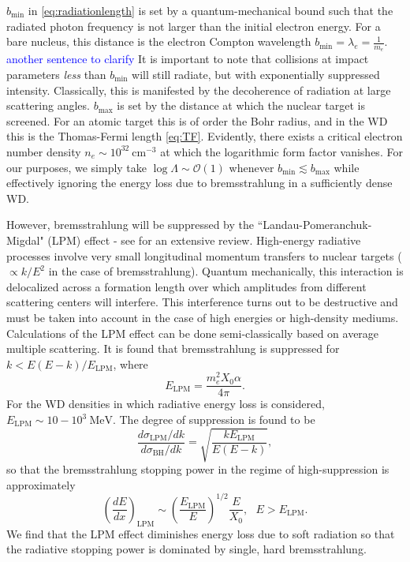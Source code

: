 \documentclass[twocolumn,showpacs,preprintnumbers,amsmath,amssymb,prd]{revtex4}
\newcommand{\OO}{\mathcal{O}}
\def\r{\right)}
\def\l{\left(}
\begin{document}
\begin{appendices}
$b_\text{min}$ in \eqref{eq:radiationlength} is set by a quantum-mechanical bound such that the radiated photon frequency is not larger than the initial electron energy. 
For a bare nucleus, this distance is the electron Compton wavelength $b_\text{min} = \lambda_e = \frac{1}{m_e}$. \textcolor{blue}{another sentence to clarify}
It is important to note that collisions at impact parameters \emph{less} than $b_\text{min}$ will still radiate, but with exponentially suppressed intensity.
Classically, this is manifested by the decoherence of radiation at large scattering angles.
$b_\text{max}$ is set by the distance at which the nuclear target is screened.
For an atomic target this is of order the Bohr radius, and in the WD this is the Thomas-Fermi length \eqref{eq:TF}.
Evidently, there exists a critical electron number density $n_e \sim 10^{32} ~\text{cm}^{-3}$ at which the logarithmic form factor vanishes.
For our purposes, we simply take $\log{\Lambda} \sim \OO(1)$ whenever $b_\text{min} \lesssim b_\text{max}$ while effectively ignoring the energy loss due to bremsstrahlung in a sufficiently dense WD.

However, bremsstrahlung will be suppressed by the ``Landau-Pomeranchuk-Migdal" (LPM) effect - see \cite{Klein:1998du} for an extensive review.
High-energy radiative processes involve very small longitudinal momentum transfers to nuclear targets ($\propto k/E^2$ in the case of bremsstrahlung).
Quantum mechanically, this interaction is delocalized across a formation length over which amplitudes from different scattering centers will interfere.
This interference turns out to be destructive and must be taken into account in the case of high energies or high-density mediums.
Calculations of the LPM effect can be done semi-classically based on average multiple scattering.
It is found that bremsstrahlung is suppressed for $k < E(E-k)/E_\text{LPM}$, where
\begin{equation}
\label{eq:LPM}
E_\text{LPM} = \frac{m_e^2 X_0 \alpha}{4 \pi}.
\end{equation}
For the WD densities in which radiative energy loss is considered, $E_\text{LPM} \sim 10-10^{3} ~\text{MeV}$.
The degree of suppression is found to be
\begin{equation}
\frac{d\sigma_\text{LPM}/dk}{d\sigma_\text{BH}/dk} = \sqrt{\frac{k E_\text{LPM}}{E (E-k)}},
\end{equation}
so that the bremsstrahlung stopping power in the regime of high-suppression is approximately
\begin{equation}
\label{eq:bremloss}
\l\frac{dE}{dx}\r_\text{LPM} \sim \l\frac{E_\text{LPM}}{E} \r^{1/2} \frac{E}{X_0}, ~~~ E>E_\text{LPM}.
\end{equation}
We find that the LPM effect diminishes energy loss due to soft radiation so that the radiative stopping power is dominated by single, hard bremsstrahlung.


\end{appendices}
\end{document}
